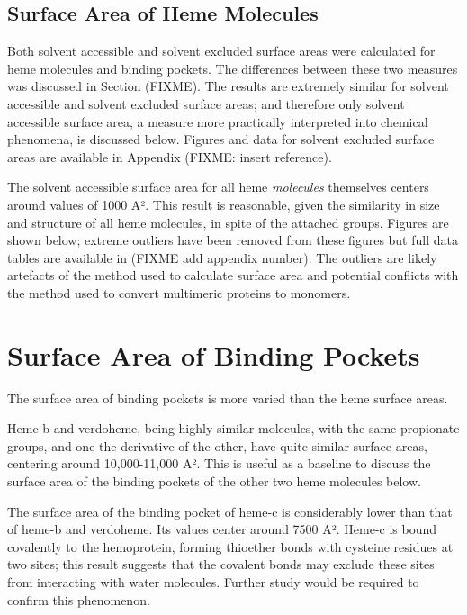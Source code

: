 \documentclass[a4paper, nobind]{templates/ociamthesis}
\begin{document}
\hypertarget{surface-area-of-heme-molecules}{%
\subsection{Surface Area of Heme Molecules}\label{surface-area-of-heme-molecules}}

Both solvent accessible and solvent excluded surface areas were calculated for heme molecules and binding pockets. The differences between these two measures was discussed in Section (FIXME). The results are extremely similar for solvent accessible and solvent excluded surface areas; and therefore only solvent accessible surface area, a measure more practically interpreted into chemical phenomena, is discussed below. Figures and data for solvent excluded surface areas are available in Appendix (FIXME: insert reference).

The solvent accessible surface area for all heme \emph{molecules} themselves centers around values of 1000 A². This result is reasonable, given the similarity in size and structure of all heme molecules, in spite of the attached groups. Figures are shown below; extreme outliers have been removed from these figures but full data tables are available in (FIXME add appendix number). The outliers are likely artefacts of the method used to calculate surface area and potential conflicts with the method used to convert multimeric proteins to monomers.

\hypertarget{surface-area-of-binding-pockets}{%
\section{Surface Area of Binding Pockets}\label{surface-area-of-binding-pockets}}

The surface area of binding pockets is more varied than the heme surface areas.

Heme-b and verdoheme, being highly similar molecules, with the same propionate groups, and one the derivative of the other, have quite similar surface areas, centering around 10,000-11,000 A². This is useful as a baseline to discuss the surface area of the binding pockets of the other two heme molecules below.

The surface area of the binding pocket of heme-c is considerably lower than that of heme-b and verdoheme. Its values center around 7500 A². Heme-c is bound covalently to the hemoprotein, forming thioether bonds with cysteine residues at two sites; this result suggests that the covalent bonds may exclude these sites from interacting with water molecules. Further study would be required to confirm this phenomenon.
\end{document}
